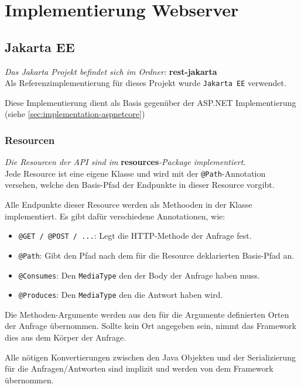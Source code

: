 \chapter{Implementierung Webserver}

\section{Jakarta EE}
\label{sec:implementation-jakarta}

\textit{Das Jakarta Projekt befindet sich im Ordner:} \textbf{rest-jakarta}\\

Als Referenzimplementierung für dieses Projekt wurde \texttt{Jakarta EE} verwendet.

Diese Implementierung dient als Basis gegenüber der ASP.NET Implementierung (siehe \ref{sec:implementation-aspnetcore})

\subsection{Resourcen}

\textit{Die Resourcen der API sind im} \textbf{resources}\textit{-Package implementiert.} \\

Jede Resource ist eine eigene Klasse und wird mit der \texttt{@Path}-Annotation versehen, welche den Basis-Pfad der Endpunkte in dieser Resource vorgibt.

Alle Endpunkte dieser Resource werden als Methooden in der Klasse implementiert.
Es gibt dafür verschiedene Annotationen, wie:

\begin{itemize}
    \item \texttt{@GET / @POST / ...}: Legt die HTTP-Methode der Anfrage fest.
    \item \texttt{@Path}: Gibt den Pfad nach dem für die Resource deklarierten Basis-Pfad an.
    \item \texttt{@Consumes}: Den \texttt{MediaType} den der Body der Anfrage haben muss.
    \item \texttt{@Produces}: Den \texttt{MediaType} den die Antwort haben wird.
\end{itemize}

Die Methoden-Argumente werden aus den für die Argumente definierten Orten der Anfrage übernommen. Sollte kein Ort angegeben sein, nimmt das Framework dies aus dem Körper der Anfrage.

Alle nötigen Konvertierungen zwischen den Java Objekten und der Serializierung für die Anfragen/Antworten sind implizit und werden von dem Framework übernommen.

